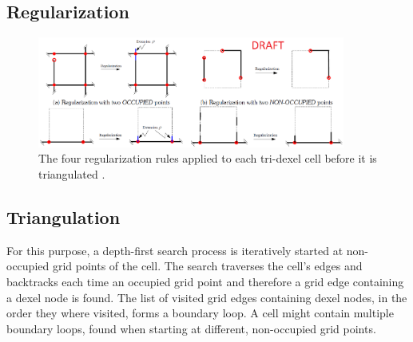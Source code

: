 \subsection{Regularization}
\label{sec:tri_dexel_regularization}

\begin{figure}
	\centering
	\includegraphics[width=0.9\textwidth]{images/tri_dexel_regularization}
	\caption{
		The four regularization rules applied to each tri-dexel cell before it is triangulated \cite{tridexel_reconstruction}.
	}
	\label{fig:tri_dexel_regularization}
\end{figure}


\begin{algorithm}
	\centering
	\begin{algorithmic}[1]
		
		\EndFunction
	\end{algorithmic}
	\caption{
		Regularizing a cell of the tri-dexel grid by applying the four rules specified in figure \ref{fig:tri_dexel_regularization} \cite{tridexel_reconstruction}.
	}
	\label{alg:tri_dexel_regularization}
\end{algorithm}


\subsection{Triangulation}
\label{sec:tri_dexel_triangulation}

For this purpose, a depth-first search process is iteratively started at non-occupied grid points of the cell.
The search traverses the cell's edges and backtracks each time an occupied grid point and therefore a grid edge containing a dexel node is found.
The list of visited grid edges containing dexel nodes, in the order they where visited, forms a boundary loop.
A cell might contain multiple boundary loops, found when starting at different, non-occupied grid points.

